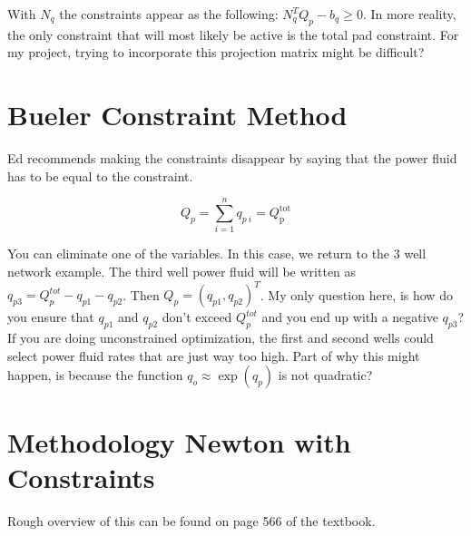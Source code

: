 \documentclass{article}
\begin{document}
With $N_{q}$ the constraints appear as the following: $N_{q}^{T}Q_{p} - b_{q} \geq 0$. In more reality, the only constraint that will most likely be active is the total pad constraint. For my project, trying to incorporate this projection matrix might be difficult?

\section{Bueler Constraint Method}

Ed recommends making the constraints disappear by saying that the power fluid has to be equal to the constraint.

\begin{equation*}
    Q_{p} = \sum_{i=1}^{n} q_{p\:i} = Q_{\text{p}}^{\text{tot}}
\end{equation*}

You can eliminate one of the variables. In this case, we return to the 3 well network example. The third well power fluid will be written as $q_{p3} = Q_{p}^{tot} - q_{p1} - q_{p2}$. Then $Q_{p} = (q_{p1}, q_{p2})^{T}$. My only question here, is how do you ensure that $q_{p1}$ and $q_{p2}$ don't exceed $Q_{p}^{tot}$ and you end up with a negative $q_{p3}$? If you are doing unconstrained optimization, the first and second wells could select power fluid rates that are just way too high. Part of why this might happen, is because the function $q_{o} \approx \exp(q_{p})$ is not quadratic?

\section{Methodology Newton with Constraints}

Rough overview of this can be found on page 566 of the textbook.
\end{document}
